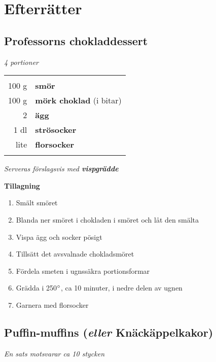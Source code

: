 \documentclass[a4paper,12pt]{article}
\newcommand{\altnamn}[1]{\noindent \small{(\textit{eller} #1)}}
\newcommand{\port}[1]{\noindent \textit{#1 portioner}}
\newcommand{\tillb}[1]{\noindent \textit{Serveras förslagsvis med \textbf{#1}} \vspace{1cm}}
\newcommand{\sats}[1]{\noindent \textit{En sats motsvarar #1}}
\begin{document}
\section{Efterrätter}

\clearpage

\subsection{Professorns chokladdessert}
\port{4}

\begin{table}[H]
	\begin{tabular}{rl}
	\hline
	&\\
		100 g & \textbf{smör}\\
		100 g & \textbf{mörk choklad} (i bitar)\\
		2 & \textbf{ägg}\\
		1 dl & \textbf{strösocker}\\
		lite & \textbf{florsocker}\\
	&\\
	\hline
	\end{tabular}
\end{table}

\tillb{vispgrädde}

\begin{multicols*}{2}

\noindent \textbf{Tillagning}
\begin{enumerate}
	\itemsep0cm
	\item Smält smöret
	\item Blanda ner smöret i chokladen i smöret och låt den smälta
	\item Vispa ägg och socker pösigt
	\item Tillsätt det avsvalnade chokladsmöret
	\item Fördela smeten i ugnssäkra portions\-formar
	\item Grädda i 250$\degree$, ca 10 minuter, i nedre delen av ugnen
	\item Garnera med florsocker
\end{enumerate}

\end{multicols*}

\clearpage

\subsection{Puffin-muffins \altnamn{Knäckäppelkakor}}
\sats{ca 10 stycken}
\end{document}
